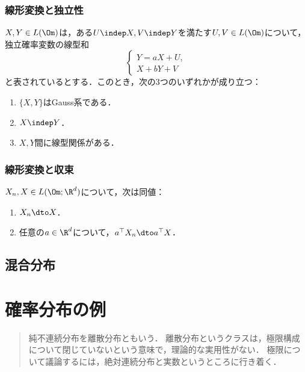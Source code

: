 \documentclass[uplatex,dvipdfmx]{jsreport}
\begin{document}
\subsection{線形変換と独立性}

\begin{theorem}[Levy (57)]
    $X,Y\in L(\Om)$は，ある$U\indep X,V\indep Y$を満たす$U,V\in L(\Om)$について，
    独立確率変数の線型和
    \[\begin{cases}
        Y=aX+U,\\
        X+bY+V
    \end{cases}\]
    と表されているとする．このとき，次の3つのいずれかが成り立つ：
    \begin{enumerate}
        \item $\{X,Y\}$はGauss系である．
        \item $X\indep Y$．
        \item $X,Y$間に線型関係がある．
    \end{enumerate}
\end{theorem}

\subsection{線形変換と収束}

\begin{theorem}
    $X_n,X\in L(\Om;\R^d)$について，次は同値：
    \begin{enumerate}
        \item $X_n\dto X$．
        \item 任意の$a\in\R^d$について，$a^\top X_n\dto a^\top X$．
    \end{enumerate}
\end{theorem}

\section{混合分布}

\chapter{確率分布の例}

\begin{quotation}
    純不連続分布を離散分布ともいう．
    離散分布というクラスは，極限構成について閉じていないという意味で，理論的な実用性がない．
    極限について議論するには，絶対連続分布と実数というところに行き着く．
\end{quotation}
\end{document}
